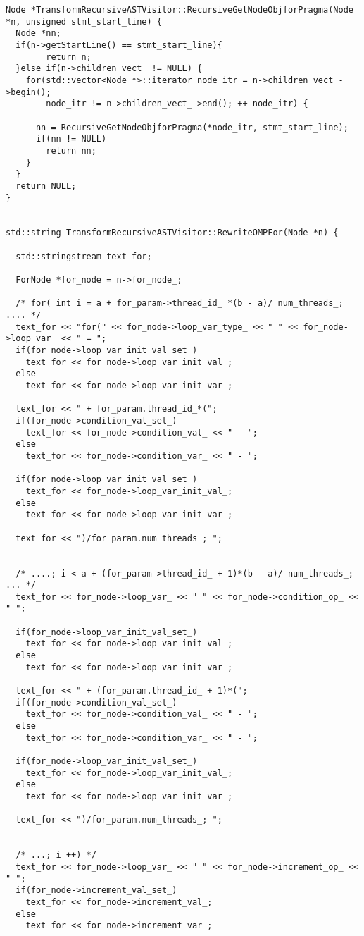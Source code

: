 \documentclass[a4paper,11pt,twoside]{book}
\begin{document}
\begin{lstlisting}[language=CCC, caption=driver/program.cpp]
Node *TransformRecursiveASTVisitor::RecursiveGetNodeObjforPragma(Node *n, unsigned stmt_start_line) {
  Node *nn;
  if(n->getStartLine() == stmt_start_line){
        return n;
  }else if(n->children_vect_ != NULL) {
    for(std::vector<Node *>::iterator node_itr = n->children_vect_->begin(); 
        node_itr != n->children_vect_->end(); ++ node_itr) {
      
      nn = RecursiveGetNodeObjforPragma(*node_itr, stmt_start_line);
      if(nn != NULL)
        return nn;
    }
  }
  return NULL;
}


std::string TransformRecursiveASTVisitor::RewriteOMPFor(Node *n) {

  std::stringstream text_for;

  ForNode *for_node = n->for_node_;

  /* for( int i = a + for_param->thread_id_ *(b - a)/ num_threads_; .... */
  text_for << "for(" << for_node->loop_var_type_ << " " << for_node->loop_var_ << " = ";
  if(for_node->loop_var_init_val_set_)
    text_for << for_node->loop_var_init_val_;
  else
    text_for << for_node->loop_var_init_var_;

  text_for << " + for_param.thread_id_*(";
  if(for_node->condition_val_set_)
    text_for << for_node->condition_val_ << " - ";
  else
    text_for << for_node->condition_var_ << " - ";

  if(for_node->loop_var_init_val_set_)
    text_for << for_node->loop_var_init_val_;
  else
    text_for << for_node->loop_var_init_var_;

  text_for << ")/for_param.num_threads_; "; 


  /* ....; i < a + (for_param->thread_id_ + 1)*(b - a)/ num_threads_; ... */
  text_for << for_node->loop_var_ << " " << for_node->condition_op_ << " ";

  if(for_node->loop_var_init_val_set_)
    text_for << for_node->loop_var_init_val_;
  else
    text_for << for_node->loop_var_init_var_;

  text_for << " + (for_param.thread_id_ + 1)*(";
  if(for_node->condition_val_set_)
    text_for << for_node->condition_val_ << " - ";
  else
    text_for << for_node->condition_var_ << " - ";

  if(for_node->loop_var_init_val_set_)
    text_for << for_node->loop_var_init_val_;
  else
    text_for << for_node->loop_var_init_var_;

  text_for << ")/for_param.num_threads_; "; 
  

  /* ...; i ++) */
  text_for << for_node->loop_var_ << " " << for_node->increment_op_ << " ";
  if(for_node->increment_val_set_)
    text_for << for_node->increment_val_;
  else
    text_for << for_node->increment_var_; 


\end{lstlisting}
\end{document}
